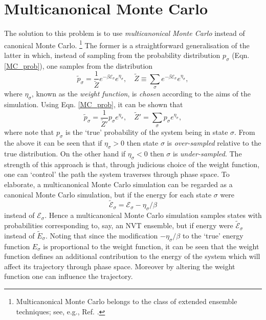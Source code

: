 \documentclass{report}
\begin{document}
\section{Multicanonical Monte Carlo}
The solution to this problem is to use \emph{multicanonical Monte Carlo}\cite{Berg_1991,Berg_1992,Smith_1995} instead of canonical Monte Carlo.
\footnote{Multicanonical Monte Carlo belongs to the class of extended ensemble techniques; see, e.g., Ref. \cite{Iba_2001}.}
The former is a straightforward generalisation of the latter in which, instead of sampling from the probability distribution $p_{\sigma}$ 
(Eqn. \eqref{MC_prob}), one samples from the distribution
\begin{equation}\label{MCMC_prob}
\tilde{p}_{\sigma}=\frac{1}{\tilde{Z}}e^{-\beta \mathcal{E}_{\sigma}}e^{\eta_{\sigma}}, \quad \tilde{Z}\equiv\sum_{\sigma}e^{-\beta \mathcal{E}_{\sigma}}e^{\eta_{\sigma}},
\end{equation}
where $\eta_{\sigma}$, known as the \emph{weight function}, is \emph{chosen} according to the aims of the simulation. 
Using Eqn. \eqref{MC_prob}, it can be shown that
\begin{equation}\label{MCMC_prob_2}
\tilde{p}_{\sigma}=\frac{1}{\tilde{Z}'}p_{\sigma}e^{\eta_{\sigma}}, \quad \tilde{Z}'=\sum_{\sigma}p_{\sigma}e^{\eta_{\sigma}},
\end{equation}
where note that $p_{\sigma}$ is the `true' probability of the system being in state $\sigma$. From the above it can be seen that if 
$\eta_{\sigma}>0$ then state $\sigma$ is \emph{over-sampled} relative to the true distribution. On the other hand if $\eta_{\sigma}<0$ then 
$\sigma$ is \emph{under-sampled}. 
%
The strength of this approach is that, through judicious choice of the weight function, one can `control' the path the system traverses 
through phase space. To elaborate, a multicanonical Monte Carlo simulation can be regarded as a canonical Monte Carlo 
simulation, but if the energy for each state $\sigma$ were 
\begin{equation}
\tilde{\mathcal{E}}_{\sigma}=\mathcal{E}_{\sigma}-\eta_{\sigma}/\beta
\end{equation}
instead of $\mathcal{E}_{\sigma}$. Hence a multicanonical Monte Carlo simulation samples states with probabilities corresponding to, say, an NVT ensemble,
but if energy were $\tilde{\mathcal{E}}_{\sigma}$ instead of $\tilde{E}_{\sigma}$. Noting that since the modification $-\eta_{\sigma}/\beta$ to the `true' 
energy function $E_{\sigma}$ is proportional to the weight function, it can be seen that the weight function defines an additional contribution to the
energy of the system which will affect its trajectory through phase space. Moreover by altering the weight function one can influence the trajectory.
\end{document}
